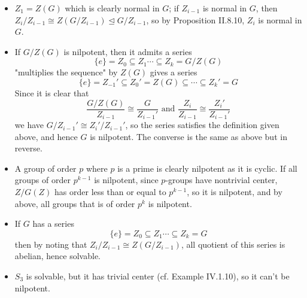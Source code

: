 \begin{pf}
\begin{itemize}
\setlength\itemsep{0pt}
\item $Z_1 = Z(G)$ which is clearly normal in $G$; if $Z_{i-1}$ is normal in $G$, then $Z_i/Z_{i-1} \cong Z(G/Z_{i-1}) \unlhd G/Z_{i-1}$, so by Proposition II.8.10, $Z_i$ is normal in $G$.
\item If $G/Z(G)$ is nilpotent, then it admits a series
\[
\{e\} = Z_0 \subseteq Z_1 \cdots \subseteq Z_k = G/Z(G) 
\]
"multiplies the sequence" by $Z(G)$ gives a series
\[
\{e\} = Z_{-1}' \subseteq Z_0' = Z(G) \subseteq \cdots \subseteq Z_{k}' = G
\]
Since it is clear that 
\[
\frac{G/Z(G)}{Z_{i-1}} \cong \frac{G}{Z_{i-1}'} \text{ and } \frac{Z_{i}}{Z_{i-1}} \cong \frac{Z_i'}{Z_{i-1}'}	
\]
we have $G/Z_{i-1}' \cong Z_i'/Z_{i-1}'$, so the series satisfies the definition given above, and hence $G$ is nilpotent. The converse is the same as above but in reverse.
\item A group of order $p$ where $p$ is a prime is clearly nilpotent as it is cyclic. If all groups of order $p^{k-1}$ is nilpotent, since $p$-groups have nontrivial center, $Z/G(Z)$ has order less than or equal to $p^{k-1}$, so it is nilpotent, and by above, all groups that is of order $p^k$ is nilpotent.
\item If $G$ has a series
\[
\{e\} = Z_0 \subseteq Z_1 \cdots \subseteq Z_k = G 
\]
then by noting that $Z_i/Z_{i-1} \cong Z(G/Z_{i-1})$, all quotient of this series is abelian, hence solvable.
\item $S_3$ is solvable, but it has trivial center (cf. Example IV.1.10), so it can't be nilpotent.	
\end{itemize}
\end{pf}

